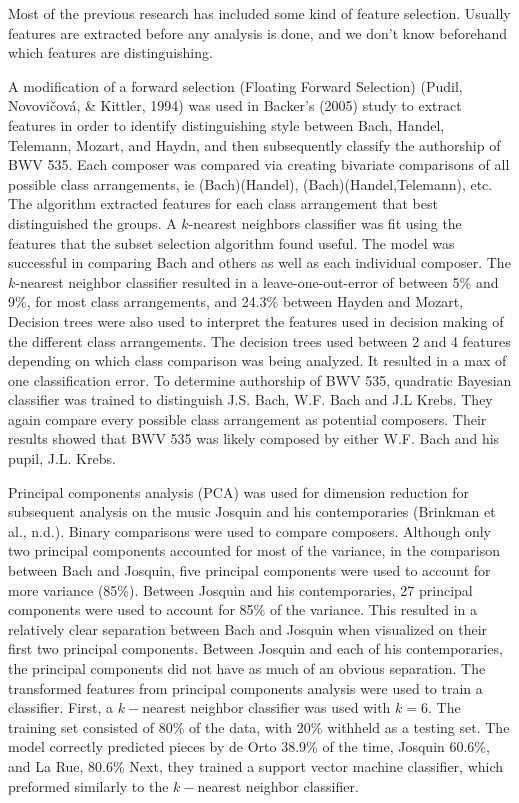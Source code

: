 \documentclass[12pt,twoside]{reedthesis}
\theoremstyle{definition}
\theoremstyle{definition}
\theoremstyle{definition}
\theoremstyle{remark}
\begin{document}
Most of the previous research has included some kind of feature
selection. Usually features are extracted before any analysis is done,
and we don't know beforehand which features are distinguishing.

A modification of a forward selection (Floating Forward Selection)
(Pudil, Novovičová, \& Kittler, 1994) was used in Backer's (2005) study
to extract features in order to identify distinguishing style between
Bach, Handel, Telemann, Mozart, and Haydn, and then subsequently
classify the authorship of BWV 535. Each composer was compared via
creating bivariate comparisons of all possible class arrangements, ie
(Bach)(Handel), (Bach)(Handel,Telemann), etc. The algorithm extracted
features for each class arrangement that best distinguished the groups.
A \(k\)-nearest neighbors classifier was fit using the features that the
subset selection algorithm found useful. The model was successful in
comparing Bach and others as well as each individual composer. The
\(k\)-nearest neighbor classifier resulted in a leave-one-out-error of
between 5\% and 9\%, for most class arrangements, and 24.3\% between
Hayden and Mozart, Decision trees were also used to interpret the
features used in decision making of the different class arrangements.
The decision trees used between 2 and 4 features depending on which
class comparison was being analyzed. It resulted in a max of one
classification error. To determine authorship of BWV 535, quadratic
Bayesian classifier was trained to distinguish J.S. Bach, W.F. Bach and
J.L Krebs. They again compare every possible class arrangement as
potential composers. Their results showed that BWV 535 was likely
composed by either W.F. Bach and his pupil, J.L. Krebs.

Principal components analysis (PCA) was used for dimension reduction for
subsequent analysis on the music Josquin and his contemporaries
(Brinkman et al., n.d.). Binary comparisons were used to compare
composers. Although only two principal components accounted for most of
the variance, in the comparison between Bach and Josquin, five principal
components were used to account for more variance (85\%). Between
Josquin and his contemporaries, 27 principal components were used to
account for 85\% of the variance. This resulted in a relatively clear
separation between Bach and Josquin when visualized on their first two
principal components. Between Josquin and each of his contemporaries,
the principal components did not have as much of an obvious separation.
The transformed features from principal components analysis were used to
train a classifier. First, a \(k-\)nearest neighbor classifier was used
with \(k = 6\). The training set consisted of 80\% of the data, with
20\% withheld as a testing set. The model correctly predicted pieces by
de Orto 38.9\% of the time, Josquin 60.6\%, and La Rue, 80.6\% Next,
they trained a support vector machine classifier, which preformed
similarly to the \(k-\)nearest neighbor classifier.
\end{document}

